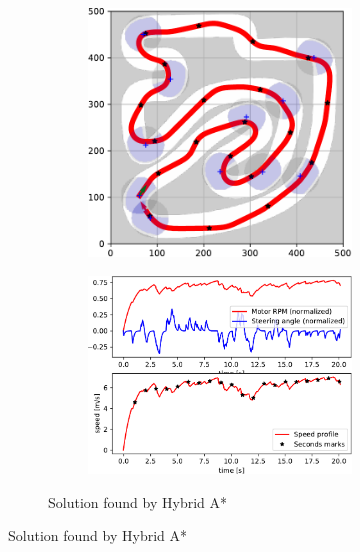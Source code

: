 \begin{figure}[!tbp]%
	\centering
		
	\begin{subfigure}[t]{\textwidth}
		\begin{subfigure}[c]{0.54\textwidth}
			\includegraphics[width=\textwidth]{../img/experiments/zurich-hybrid_astar-trajectory}
		\end{subfigure}
		\hfill
		\begin{subfigure}[c]{0.45\textwidth}
			\includegraphics[width=\textwidth]{../img/experiments/zurich-hybrid_astar-actuators}
		\end{subfigure}
		\caption{Solution found by Hybrid A*}
		\label{fig:zurich-hybrid_astar}
	\end{subfigure}


\end{figure}
